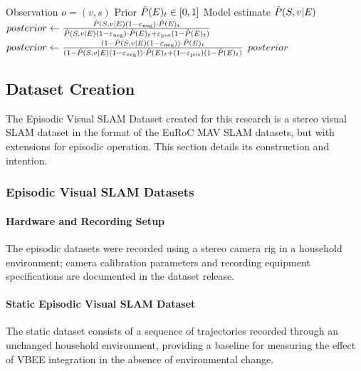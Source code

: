 \begin{singlespace}
    \begin{algorithm}[H]
        \caption{Bayesian Update Step}
        \label{alg:bayesian_update_impl}
        \begin{algorithmic}
            \Require Observation $o = (v, s)$
            \Require Prior $\hat{P}(E)_t \in [0,1]$
            \Require Model estimate $\hat{P}(S,v|E)$
            \State $posterior \gets \frac{\hat{P}(S,v|E) (1 - \varepsilon_{\text{neg}}) \cdot \hat{P}(E)_t}{\hat{P}(S,v|E) (1 - \varepsilon_{\text{neg}}) \cdot \hat{P}(E)_t + \varepsilon_{\text{pos}} (1 - \hat{P}(E)_t)}$
            \Else
            \State $posterior \gets \frac{(1 - \hat{P}(S,v|E) (1 - \varepsilon_{\text{neg}})) \cdot \hat{P}(E)_t}{(1 - \hat{P}(S,v|E) (1 - \varepsilon_{\text{neg}})) \cdot \hat{P}(E)_t + (1 - \varepsilon_{\text{pos}})(1 - \hat{P}(E)_t)}$
            \EndIf
            \State \Return $posterior$
        \end{algorithmic}
    \end{algorithm}
\end{singlespace}

\subsection{Dataset Creation}
\label{sec:dataset_creation}

The Episodic Visual SLAM Dataset created for this research is a stereo visual SLAM dataset in the format of the EuRoC MAV SLAM datasets, but with extensions for episodic operation. This section details its construction and intention.

\subsubsection{Episodic Visual SLAM Datasets}

\paragraph{Hardware and Recording Setup}
The episodic datasets were recorded using a stereo camera rig in a household environment; camera calibration parameters and recording equipment specifications are documented in the dataset release.

\paragraph{Static Episodic Visual SLAM Dataset}
The static dataset consists of a sequence of trajectories recorded through an unchanged household environment, providing a baseline for measuring the effect of VBEE integration in the absence of environmental change.

